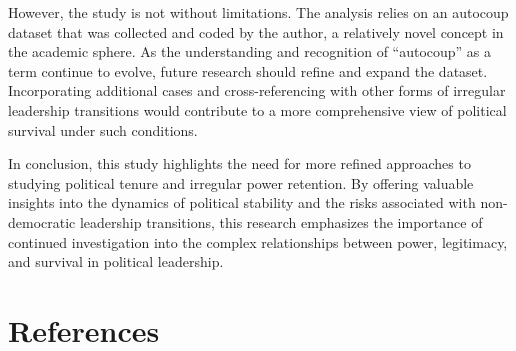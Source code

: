 \documentclass[
  12pt,
]{article}
\begin{document}
However, the study is not without limitations. The analysis relies on an
autocoup dataset that was collected and coded by the author, a
relatively novel concept in the academic sphere. As the understanding
and recognition of ``autocoup'' as a term continue to evolve, future
research should refine and expand the dataset. Incorporating additional
cases and cross-referencing with other forms of irregular leadership
transitions would contribute to a more comprehensive view of political
survival under such conditions.

In conclusion, this study highlights the need for more refined
approaches to studying political tenure and irregular power retention.
By offering valuable insights into the dynamics of political stability
and the risks associated with non-democratic leadership transitions,
this research emphasizes the importance of continued investigation into
the complex relationships between power, legitimacy, and survival in
political leadership.

\newpage

\section*{References}\label{references}
\end{document}
